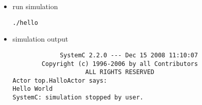 \begin{frame}[fragile=singleslide]
\begin{itemize}
\item run simulation
\begin{lstlisting}
./hello
\end{lstlisting}
\item simulation output
\begin{lstlisting}
             SystemC 2.2.0 --- Dec 15 2008 11:10:07
        Copyright (c) 1996-2006 by all Contributors
                    ALL RIGHTS RESERVED
Actor top.HalloActor says:
Hello World
SystemC: simulation stopped by user.
\end{lstlisting}
\end{itemize}
\end{frame}





